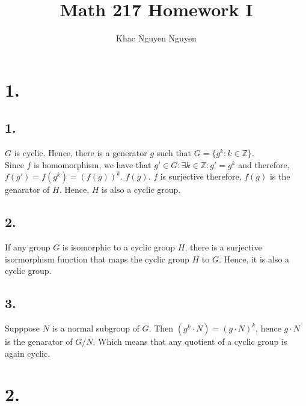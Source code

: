 \documentclass[11pt]{article}
\title{\textbf{Math 217 Homework I}}
\author{Khac Nguyen Nguyen}
\date{}
\begin{document}
\section*{1.}
\subsection*{1.}
$G$ is cyclic. Hence, there is a generator $g$ such that $G = \{ g^k: k \in \mathbb{Z} \}$. \\
Since $f$ is homomorphism, we have that $g' \in G: \exists k \in \mathbb{Z}: g' = g^k$ and therefore, $f(g') = f(g^k) = (f(g))^k$. $f(g)$. $f$ is surjective therefore, $f(g)$ is the genarator of $H$. Hence, $H$ is also a cyclic group. 
\subsection*{2.}
If any group $G$ is isomorphic to a cyclic group $H$, there is a surjective isormorphism function that maps the cyclic group $H$ to $G$. Hence, it is also a cyclic group. \\
\subsection*{3.}
Supppose $N$ is a normal subgroup of $G$. Then $(g^k \cdot N) = (g \cdot N)^k$, hence $g \cdot N$ is the genarator of $G/N$. Which means that any quotient of a cyclic group is again cyclic. \\
\pagebreak
\section*{2.}
\end{document}
